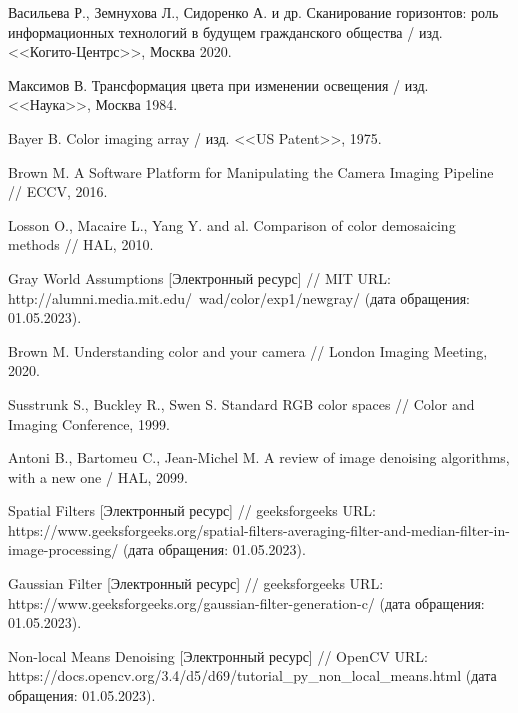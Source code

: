 \begingroup 
\renewcommand{\section}[2]{\anonsection{Список использованных источников}}
\begin{thebibliography}{00}

    Васильева Р., Земнухова Л., Сидоренко А. и др.
    Сканирование горизонтов: роль информационных технологий в будущем гражданского общества /
    изд. <<Когито-Центрс>>, Москва 2020.

    Максимов В.
    Трансформация цвета при изменении освещения /
    изд. <<Наука>>, Москва 1984.

    Bayer B.
    Color imaging array /
    изд. <<US Patent>>, 1975.

    Brown M.
    A Software Platform for Manipulating the Camera Imaging Pipeline //
    ECCV, 2016.

    Losson O., Macaire L., Yang Y. and al.
    Comparison of color demosaicing methods //
    HAL, 2010.

    Gray World Assumptions
    [Электронный ресурс] //
    MIT
    URL: http://alumni.media.mit.edu/~wad/color/exp1/newgray/
    (дата обращения: 01.05.2023).

    Brown M.
    Understanding color and your camera //
    London Imaging Meeting, 2020.

    Susstrunk S., Buckley R., Swen S.
    Standard RGB color spaces //
    Color and Imaging Conference, 1999.

    Antoni B., Bartomeu C., Jean-Michel M.
    A review of image denoising algorithms, with a new one /
    HAL, 2099.

    Spatial Filters
    [Электронный ресурс] //
    geeksforgeeks
    URL: https://www.geeksforgeeks.org/spatial-filters-averaging-filter-and-median-filter-in-image-processing/
    (дата обращения: 01.05.2023).

    Gaussian Filter
    [Электронный ресурс] //
    geeksforgeeks
    URL: https://www.geeksforgeeks.org/gaussian-filter-generation-c/
    (дата обращения: 01.05.2023).

    Non-local Means Denoising
    [Электронный ресурс] //
    OpenCV
    URL: https://docs.opencv.org/3.4/d5/d69/tutorial\_py\_non\_local\_means.html
    (дата обращения: 01.05.2023).


\end{thebibliography}
